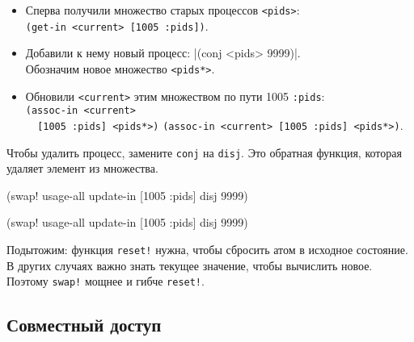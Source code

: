 \begin{itemize}

\item
  Сперва получили множество старых процессов \verb|<pids>|:\\
  \verb|(get-in <current> [1005 :pids])|.

\item
  Добавили к нему новый процесс: \spverb|(conj <pids> 9999)|.\ifnarrow\ \else\\\fi
  Обозначим новое множество \verb|<pids*>|.

\item
  Обновили \verb|<current>| этим множеством по пути 1005 \arr{} \verb|:pids|:\\
  \ifnarrow
  \verb|(assoc-in <current>| \\
  \verb|  [1005 :pids] <pids*>)|
  \else
  \verb|(assoc-in <current> [1005 :pids] <pids*>)|.
  \fi

\end{itemize}

Чтобы удалить процесс, замените \verb|conj| на \verb|disj|. Это обратная
функция, которая удаляет элемент из множества.


\ifnarrow

\begin{english}
  \begin{clojure}
(swap! usage-all
  update-in [1005 :pids] disj 9999)
  \end{clojure}
\end{english}

\else

\begin{english}
  \begin{clojure}
(swap! usage-all update-in [1005 :pids] disj 9999)
  \end{clojure}
\end{english}

\fi

Подытожим: функция \verb|reset!| нужна, чтобы сбросить атом в исходное
состояние. В других случаях важно знать текущее значение, чтобы вычислить
новое. Поэтому \verb|swap!| мощнее и гибче \verb|reset!|.

\subsection{Совместный доступ}


